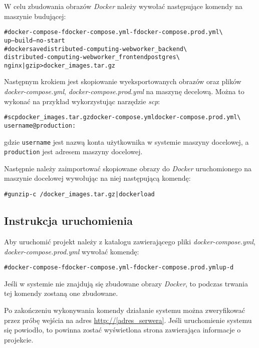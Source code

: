 \documentclass[a4paper,11pt,twoside]{report}
\theoremstyle{definition}
\begin{document}
		W celu zbudowania obrazów \textit{Docker} należy wywołać następujące komendy na maszynie budującej:

		\begin{alltt}
	# docker-compose -f docker-compose.yml -f docker-compose.prod.yml \textbackslash
	up --build --no-start
	# docker save distributed-computing-webworker_backend \textbackslash
	distributed-computing-webworker_frontend postgres \textbackslash 
	nginx | gzip > docker_images.tar.gz    
		\end{alltt}

		Następnym krokiem jest skopiowanie wyeksportowanych obrazów oraz plików \textit{docker-compose.yml}, \textit{docker-compose.prod.yml} na maszynę decelową. Można to wykonać na przykład wykorzystując narzędzie \textit{scp}:

		\begin{alltt}
	# scp docker_images.tar.gz docker-compose.yml docker-compose.prod.yml \textbackslash
	username@production:~
		\end{alltt}

		gdzie \texttt{username} jest nazwą konta użytkownika w systemie maszyny docelowej, a \texttt{production} jest adresem maszyny docelowej.
		
		Następnie należy zaimportować skopiowane obrazy do \textit{Docker} uruchomionego na maszynie docelowej wywołując na niej następującą komendę:

		\begin{alltt}
	# gunzip -c ~/docker_images.tar.gz | docker load
		\end{alltt}



	\subsection{Instrukcja uruchomienia}
		\label{start-system}
		Aby uruchomić projekt należy z katalogu zawierającego pliki \textit{docker-compose.yml}, \textit{docker-compose.prod.yml} wywołać komendę:

		\begin{alltt}
	# docker-compose -f docker-compose.yml -f docker-compose.prod.yml up -d
		\end{alltt}

		Jeśli w systemie nie znajdują się zbudowane obrazy \textit{Docker}, to podczas trwania tej komendy zostaną one zbudowane.
		
		Po zakończeniu wykonywania komendy działanie systemu można zweryfikować przez próbę wejścia na adres \url{http://[adres_serwera]}. Jeśli uruchomienie systemu się powiodło, to powinna zostać wyświetlona strona zawierająca informacje o projekcie.
\end{document}
